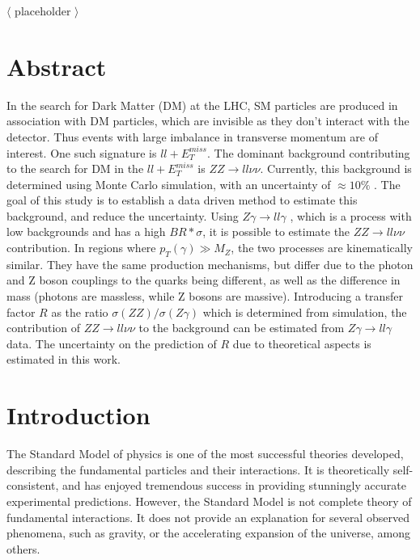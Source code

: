 \documentclass[11pt,a4paper,openright,twoside]{report}
\newcommand{\ZZ}{$ZZ\to ll\nu\nu$ }
\newcommand{\Zg}{$Z\gamma\to ll\gamma$ }
\newcommand\blankpage{%
    \null
    \thispagestyle{empty}%
    \addtocounter{page}{-1}%
    \newpage}
\begin{document}
$\langle$ placeholder $\rangle$

\newpage
\blankpage
\newpage

\chapter*{Abstract}
\setcounter{page}{1}
In the search for Dark Matter (DM) at the LHC, SM particles are produced in association with DM particles, which are invisible as they don't interact with the detector. Thus events with large imbalance in transverse momentum are of interest. One such signature is $ll + E_T^{miss}$. The dominant background contributing to the search for DM in the $ll + E_T^{miss}$ is $ZZ \rightarrow ll\nu\nu$.  Currently, this background is determined using Monte Carlo simulation, with an uncertainty of $\approx 10\%$ \cite{ZH_ATLAS}. The goal of this study is to establish a data driven method to estimate this background, and reduce the uncertainty. Using \Zg, which is a process with low backgrounds and has a high $BR*\sigma$, it is possible to estimate the \ZZ contribution. In regions where $p_{T}(\gamma) \gg M_{Z}$, the two processes are kinematically similar. They have the same production mechanisms, but differ due to the photon and Z boson couplings to the quarks being different, as well as the difference in mass (photons are massless, while Z bosons are massive). Introducing a transfer factor $R$ as the ratio $\sigma(ZZ)/\sigma(Z\gamma)$ which is determined from simulation, the contribution of \ZZ to the background can be estimated from \Zg data. The uncertainty on the prediction of $R$ due to theoretical aspects is estimated in this work.
\thispagestyle{plain}
\tableofcontents
\thispagestyle{empty}
\cleardoublepage
{}
\chapter{Introduction}
\setcounter{page}{1}

The Standard Model of physics is one of the most successful theories developed, describing the fundamental particles and their interactions. It is theoretically self-consistent, and has enjoyed tremendous success in providing stunningly accurate experimental predictions. However, the Standard Model is not complete theory of fundamental interactions. It does not provide an explanation for several observed phenomena, such as gravity, or the accelerating expansion of the universe, among others.
\end{document}
